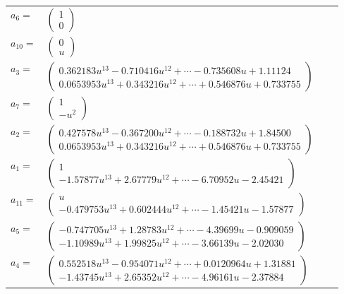 \documentclass[1p]{elsarticle_modified}
\theoremstyle{definition}
\begin{document}
\begin{tabular}{m{7pt} m{180pt} m{7pt} m{180pt} }
\flushright $a_{6}=$&$\begin{pmatrix}1\\0\end{pmatrix}$ \\
\flushright $a_{10}=$&$\begin{pmatrix}0\\u\end{pmatrix}$ \\
\flushright $a_{3}=$&$\begin{pmatrix}0.362183 u^{13}-0.710416 u^{12}+\cdots-0.735608 u+1.11124\\0.0653953 u^{13}+0.343216 u^{12}+\cdots+0.546876 u+0.733755\end{pmatrix}$ \\
\flushright $a_{7}=$&$\begin{pmatrix}1\\- u^2\end{pmatrix}$ \\
\flushright $a_{2}=$&$\begin{pmatrix}0.427578 u^{13}-0.367200 u^{12}+\cdots-0.188732 u+1.84500\\0.0653953 u^{13}+0.343216 u^{12}+\cdots+0.546876 u+0.733755\end{pmatrix}$ \\
\flushright $a_{1}=$&$\begin{pmatrix}1\\-1.57877 u^{13}+2.67779 u^{12}+\cdots-6.70952 u-2.45421\end{pmatrix}$ \\
\flushright $a_{11}=$&$\begin{pmatrix}u\\-0.479753 u^{13}+0.602444 u^{12}+\cdots-1.45421 u-1.57877\end{pmatrix}$ \\
\flushright $a_{5}=$&$\begin{pmatrix}-0.747705 u^{13}+1.28783 u^{12}+\cdots-4.39699 u-0.909059\\-1.10989 u^{13}+1.99825 u^{12}+\cdots-3.66139 u-2.02030\end{pmatrix}$ \\
\flushright $a_{4}=$&$\begin{pmatrix}0.552518 u^{13}-0.954071 u^{12}+\cdots+0.0120964 u+1.31881\\-1.43745 u^{13}+2.65352 u^{12}+\cdots-4.96161 u-2.37884\end{pmatrix}$ \\

\end{tabular}
\end{document}
